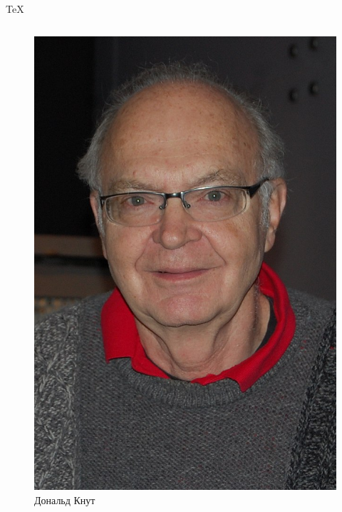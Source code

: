 \documentclass[10pt,aspectratio=169]{beamer}
\begin{document}
\begin{frame}{\TeX}
\begin{columns}
\begin{column}{0.25\textwidth}
\begin{figure}[h!]
    				\includegraphics[width=\textwidth]{img/knuth.jpg}
    				\caption{Дональд Кнут}
    				\label{fig:knuth}
    			\end{figure}
    		\end{column}
    	\end{columns}
    \end{frame}
    
\end{document}

